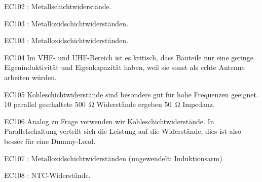   \begin{sol}{EC102}    
    : Metallschichtwiderstände.
  \end{sol}

  \begin{sol}{EC103}    
    : Metalloxidschichtwiderständen.
  \end{sol}

  \begin{sol}{EC103}    
    : Metalloxidschichtwiderständen.
  \end{sol}

  \begin{sol}{EC104}    
    Im VHF- und UHF-Bereich ist es kritisch, dass Bauteile nur eine geringe Eigeninduktivität und Eigenkapazität haben, weil sie sonst als echte Antenne arbeiten würden.
  \end{sol}

   \begin{sol}{EC105}    
      Kohleschichtwiderstände sind besonders gut für hohe Frequenzen geeignet. 10 parallel geschaltete \SI{500}{\ohm} Widerstände ergeben \SI{50}{\ohm} Impedanz.
   \end{sol}

   \begin{sol}{EC106}    
      Analog zu Frage  verwenden wir Kohleschichtwiderstände. In Parallelschaltung verteilt sich die Leistung auf die Widerstände, dies ist also besser für eine Dummy-Load.
   \end{sol}

  \begin{sol}{EC107}    
    : Metalloxidschichtwiderständen (ungewendelt: Induktionsarm)
  \end{sol}

  \begin{sol}{EC108}    
    : NTC-Widerstände.
  \end{sol}

